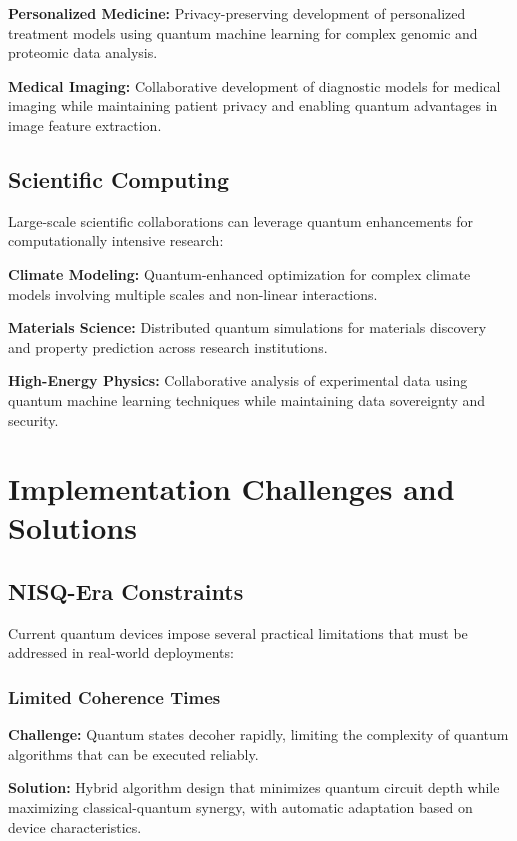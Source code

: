 \documentclass[10pt,journal,compsoc]{IEEEtran}
\begin{document}
\textbf{Personalized Medicine:} Privacy-preserving development of personalized treatment models using quantum machine learning for complex genomic and proteomic data analysis.

\textbf{Medical Imaging:} Collaborative development of diagnostic models for medical imaging while maintaining patient privacy and enabling quantum advantages in image feature extraction.

\subsection{Scientific Computing}

Large-scale scientific collaborations can leverage quantum enhancements for computationally intensive research:

\textbf{Climate Modeling:} Quantum-enhanced optimization for complex climate models involving multiple scales and non-linear interactions.

\textbf{Materials Science:} Distributed quantum simulations for materials discovery and property prediction across research institutions.

\textbf{High-Energy Physics:} Collaborative analysis of experimental data using quantum machine learning techniques while maintaining data sovereignty and security.

\section{Implementation Challenges and Solutions}

\subsection{NISQ-Era Constraints}

Current quantum devices impose several practical limitations that must be addressed in real-world deployments:

\subsubsection{Limited Coherence Times}
\textbf{Challenge:} Quantum states decoher rapidly, limiting the complexity of quantum algorithms that can be executed reliably.

\textbf{Solution:} Hybrid algorithm design that minimizes quantum circuit depth while maximizing classical-quantum synergy, with automatic adaptation based on device characteristics.
\end{document}
